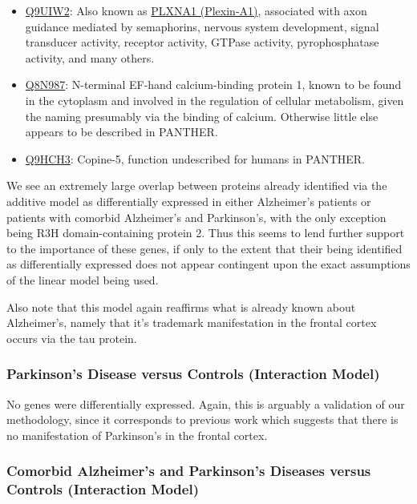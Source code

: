 \begin{itemize}
\item \href{http://www.pantherdb.org/genes/gene.do?acc=HUMAN\%7CHGNC\%3D9099\%7CUniProtKB\%3DQ9UIW2}{Q9UIW2}: Also known as \href{https://www.uniprot.org/uniprot/Q9UIW2}{PLXNA1 (Plexin-A1)}, associated with axon guidance mediated by semaphorins, nervous system development, signal transducer activity, receptor activity, GTPase activity, pyrophosphatase activity, and many others.
\item \href{http://www.pantherdb.org/genes/gene.do?acc=HUMAN\%7CHGNC\%3D20983\%7CUniProtKB\%3DQ8N987}{Q8N987}: N-terminal EF-hand calcium-binding protein 1, known to be found in the cytoplasm and involved in the regulation of cellular metabolism, given the naming presumably via the binding of calcium. Otherwise little else appears to be described in PANTHER.
\item \href{http://www.pantherdb.org/genes/gene.do?acc=HUMAN\%7CHGNC\%3D2318\%7CUniProtKB\%3DQ9HCH3}{Q9HCH3}: Copine-5, function undescribed for humans in PANTHER.
\end{itemize}

We see an extremely large overlap between proteins already identified via the additive model as differentially expressed in either Alzheimer's patients or patients with comorbid Alzheimer's and Parkinson's, with the only exception being R3H domain-containing protein 2. Thus this seems to lend further support to the importance of these genes, if only to the extent that their being identified as differentially expressed does not appear contingent upon the exact assumptions of the linear model being used.

Also note that this model again reaffirms what is already known about Alzheimer's, namely that it's trademark manifestation in the frontal cortex occurs via the tau protein.

\subsubsection{Parkinson's Disease versus Controls (Interaction Model)}

No genes were differentially expressed. Again, this is arguably a validation of our methodology, since it corresponds to previous work which suggests that there is no manifestation of Parkinson's in the frontal cortex.

\subsubsection{Comorbid Alzheimer's and Parkinson's Diseases versus Controls (Interaction Model)}

